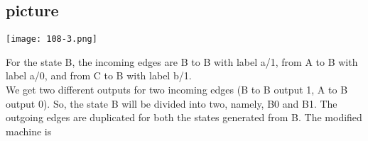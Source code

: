 \documentclass{article}
\begin{document}
\vspace*{0.1cm}
\begin{center}
\section{picture}
\texttt{[image: 108-3.png]}
\end{center}


For the state B, the incoming edges are B to B with label a/1, from A to B with label a/0, and from
C to B with label b/1.\\
\hspace*{0.5cm} We get two different outputs for two incoming edges (B to B output 1, A to B output 0). So, the
state B will be divided into two, namely, B0 and B1. The outgoing edges are duplicated for both
the states generated from B. The modified machine is\\
\end{document}
